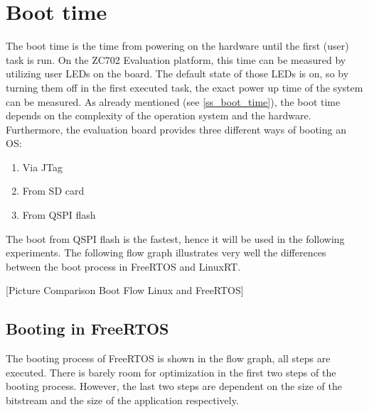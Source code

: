 \section{Boot time}\label{s_boot_time}
The boot time is the time from powering on the hardware until the first (user) task is run. 
On the ZC702 Evaluation platform, this time can be measured by utilizing user \acp{LED} on the board.  
The default state of those LEDs is on, so by turning them off in the first executed task, the exact power up time of the system can be measured.  
As already mentioned (see \ref{ss_boot_time}), the boot time depends on the complexity of the operation system and the hardware. 
Furthermore, the evaluation board provides three different ways of booting an \ac{OS}:
\begin{enumerate}
	\item Via \ac{JTag}
	\item From \ac{SD} card
	\item From \ac{QSPI} flash
\end{enumerate}
The boot from \ac{QSPI} flash is the fastest, hence it will be used in the following experiments.
The following flow graph illustrates very well the differences between the boot process in FreeRTOS and LinuxRT.

[Picture Comparison Boot Flow Linux and FreeRTOS]

\subsection{Booting in FreeRTOS}
The booting process of FreeRTOS is shown in the flow graph, all steps are executed.
There is barely room for optimization in the first two steps of the booting process. 
However, the last two steps are dependent on the size of the bitstream and the size of the application respectively. 

